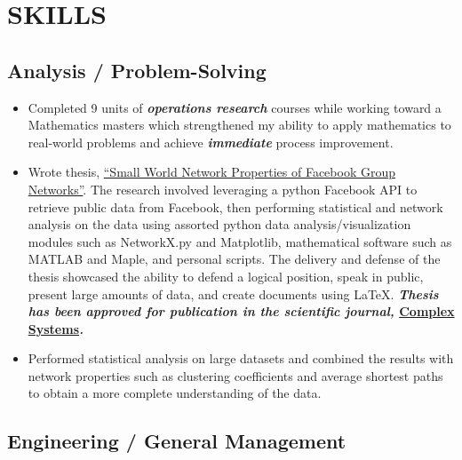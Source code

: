 \documentclass[10pt]{article}
\begin{document}
\section{SKILLS}\label{skills}

\subsection{Analysis / Problem-Solving}\label{analysis-problem-solving}

\begin{itemize}
\itemsep1pt\parskip0pt
\item
  Completed 9 units of \textbf{\emph{operations research}} courses while
  working toward a Mathematics masters which strengthened my ability to
  apply mathematics to real-world problems and achieve
  \textbf{\emph{immediate}} process improvement.
\item
  Wrote thesis,
  \href{http://www.jasonwohlgemuth.com/doc/thesis.pdf}{``Small World
  Network Properties of Facebook Group Networks''}. The research
  involved leveraging a python Facebook API to retrieve public data from
  Facebook, then performing statistical and network analysis on the data
  using assorted python data analysis/visualization modules such as
  NetworkX.py and Matplotlib, mathematical software such as MATLAB and
  Maple, and personal scripts. The delivery and defense of the thesis
  showcased the ability to defend a logical position, speak in public,
  present large amounts of data, and create documents using LaTeX.
  \textbf{\emph{Thesis has been approved for publication in the
  scientific journal, }\href{https://www.complex-systems.com/}{Complex
  Systems}\emph{.}}
\item
  Performed statistical analysis on large datasets and combined the
  results with network properties such as clustering coefficients and
  average shortest paths to obtain a more complete understanding of the
  data.
\end{itemize}

\subsection{Engineering / General
Management}\label{engineering-general-management}
\end{document}
